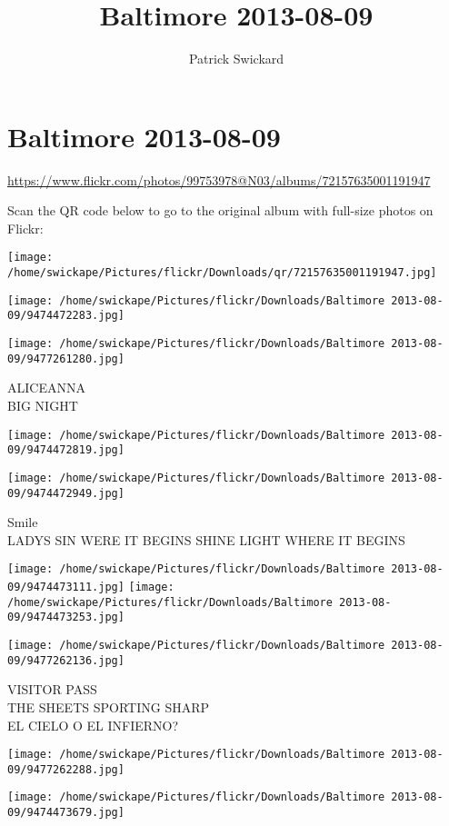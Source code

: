 \documentclass[10pt,letterpaper]{article}
\title{Baltimore 2013-08-09}
\author{Patrick Swickard}
\date{}
\begin{document}
\section*{Baltimore 2013-08-09}

\url{https://www.flickr.com/photos/99753978@N03/albums/72157635001191947}

Scan the QR code below to go to the original album with full-size photos on Flickr:

\texttt{[image: /home/swickape/Pictures/flickr/Downloads/qr/72157635001191947.jpg]}
\pagebreak

\texttt{[image: /home/swickape/Pictures/flickr/Downloads/Baltimore 2013-08-09/9474472283.jpg]}

\vspace{0.25in}
\texttt{[image: /home/swickape/Pictures/flickr/Downloads/Baltimore 2013-08-09/9477261280.jpg]}

ALICEANNA\\
BIG NIGHT
\pagebreak

\texttt{[image: /home/swickape/Pictures/flickr/Downloads/Baltimore 2013-08-09/9474472819.jpg]}

\vspace{0.25in}
\texttt{[image: /home/swickape/Pictures/flickr/Downloads/Baltimore 2013-08-09/9474472949.jpg]}

Smile\\
LADYS SIN WERE IT BEGINS SHINE LIGHT WHERE IT BEGINS
\pagebreak

\texttt{[image: /home/swickape/Pictures/flickr/Downloads/Baltimore 2013-08-09/9474473111.jpg]}
\texttt{[image: /home/swickape/Pictures/flickr/Downloads/Baltimore 2013-08-09/9474473253.jpg]}

\texttt{[image: /home/swickape/Pictures/flickr/Downloads/Baltimore 2013-08-09/9477262136.jpg]}

VISITOR PASS\\
THE SHEETS SPORTING SHARP\\
EL CIELO O EL INFIERNO?
\pagebreak

\texttt{[image: /home/swickape/Pictures/flickr/Downloads/Baltimore 2013-08-09/9477262288.jpg]}

\vspace{0.25in}
\texttt{[image: /home/swickape/Pictures/flickr/Downloads/Baltimore 2013-08-09/9474473679.jpg]}
\end{document}
